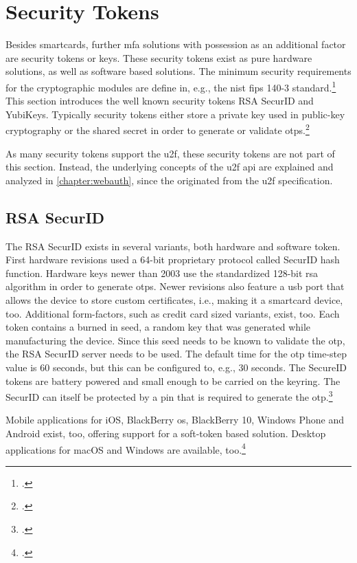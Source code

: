 \section{Security Tokens}

Besides smartcards, further \gls{mfa} solutions with possession as an additional factor are security tokens or keys. These security tokens exist as pure hardware solutions, as well as software based solutions. The minimum security requirements for the cryptographic modules are define in, e.g., the \gls{nist} \gls{fips} 140-3 standard.\footcites[See][]{FIPS140-3} This section introduces the well known security tokens \frqq RSA SecurID\flqq{} and \frqq YubiKeys\flqq. Typically security tokens either store a private key used in public-key cryptography or the shared secret in order to generate or validate \glspl{otp}.\footcites[See][Chapter 28.4.3]{1174011}

As many security tokens support the \gls{u2f}, these security tokens are not part of this section. Instead, the underlying concepts of the \gls{u2f} \gls{api} are explained and analyzed in \autoref{chapter:webauth}, since the \wa{} originated from the \gls{u2f} specification.

\subsection{RSA SecurID}

The RSA SecurID exists in several variants, both hardware and software token. First hardware revisions used a 64-bit proprietary protocol called \frqq SecurID hash function\flqq. Hardware keys newer than 2003 use the standardized 128-bit \gls{rsa} algorithm in order to generate \glspl{otp}. Newer revisions also feature a \gls{usb} port that allows the device to store custom certificates, i.e., making it a smartcard device, too. Additional form-factors, such as credit card sized variants, exist, too. Each token contains a burned in seed, a random key that was generated while manufacturing the device. Since this seed needs to be known to validate the \gls{otp}, the RSA SecurID server needs to be used. The default time for the \gls{otp} time-step value is 60 seconds, but this can be configured to, e.g., 30 seconds. The SecureID tokens are battery powered and small enough to be carried on the keyring. The SecurID can itself be protected by a \gls{pin} that is required to generate the \gls{otp}.\footcites[See][479--480]{eckert-it-sec-9}[See][296]{4351500}

Mobile applications for iOS, BlackBerry \gls{os}, BlackBerry 10, Windows Phone and Android exist, too, offering support for a soft-token based solution. Desktop applications for macOS and Windows are available, too.\footcites[See][3--6]{ibm-mfa}[See][49]{5542954}

